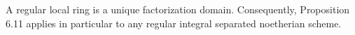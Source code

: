 A regular local ring is a unique factorization domain. Consequently, Proposition 6.11 applies in particular to any regular integral separated noetherian scheme.
